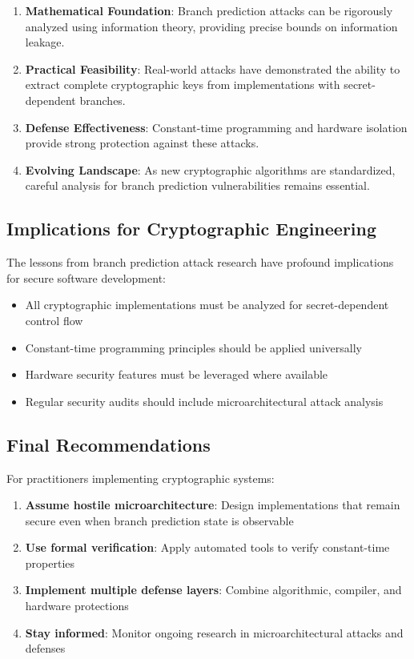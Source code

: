 \documentclass[11pt,a4paper]{article}
\theoremstyle{definition}
\begin{document}
\begin{enumerate}
\item \textbf{Mathematical Foundation}: Branch prediction attacks can be rigorously analyzed using information theory, providing precise bounds on information leakage.

\item \textbf{Practical Feasibility}: Real-world attacks have demonstrated the ability to extract complete cryptographic keys from implementations with secret-dependent branches.

\item \textbf{Defense Effectiveness}: Constant-time programming and hardware isolation provide strong protection against these attacks.

\item \textbf{Evolving Landscape}: As new cryptographic algorithms are standardized, careful analysis for branch prediction vulnerabilities remains essential.
\end{enumerate}

\subsection{Implications for Cryptographic Engineering}

The lessons from branch prediction attack research have profound implications for secure software development:

\begin{itemize}
\item All cryptographic implementations must be analyzed for secret-dependent control flow
\item Constant-time programming principles should be applied universally
\item Hardware security features must be leveraged where available
\item Regular security audits should include microarchitectural attack analysis
\end{itemize}

\subsection{Final Recommendations}

For practitioners implementing cryptographic systems:

\begin{enumerate}
\item \textbf{Assume hostile microarchitecture}: Design implementations that remain secure even when branch prediction state is observable
\item \textbf{Use formal verification}: Apply automated tools to verify constant-time properties
\item \textbf{Implement multiple defense layers}: Combine algorithmic, compiler, and hardware protections
\item \textbf{Stay informed}: Monitor ongoing research in microarchitectural attacks and defenses
\end{enumerate}
\end{document}
